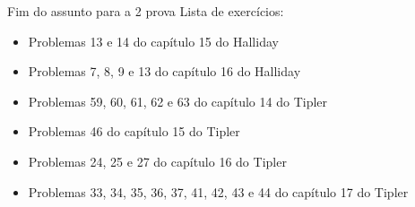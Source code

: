 \documentclass[t,%
brazilian,%
11pt,%
aspectratio=169,%
table%
]{beamer}
\newcommand{\esima}{\textordfeminine }
\begin{document}

\begin{frame}{Fim do assunto para a 2\esima{} prova}
    Lista de exercícios:
    \begin{itemize}
        \item Problemas 13 e 14 do capítulo 15 do Halliday
        \item Problemas 7, 8, 9 e 13 do capítulo 16 do Halliday
        \item Problemas 59, 60, 61, 62 e 63 do capítulo 14 do Tipler
        \item Problemas 46 do capítulo 15 do Tipler
        \item Problemas 24, 25 e 27 do capítulo 16 do Tipler
        \item Problemas 33, 34, 35, 36, 37, 41, 42, 43 e 44 do capítulo 17 do Tipler
    \end{itemize}
\end{frame}
\end{document}
